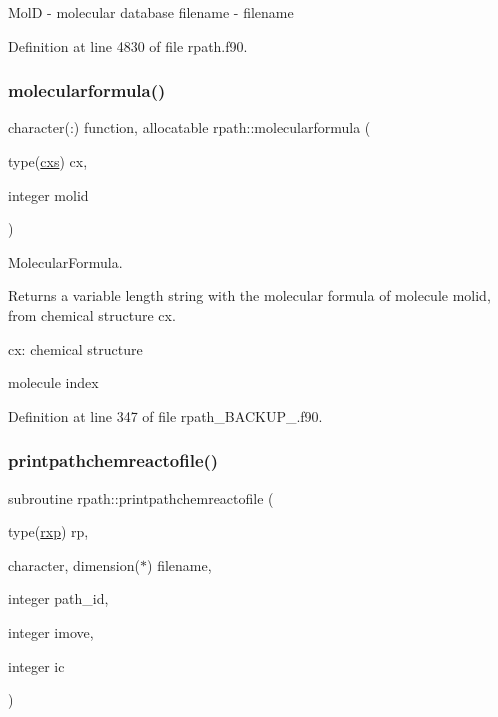 MolD -\/ molecular database filename -\/ filename 

Definition at line 4830 of file rpath.\+f90.

\mbox{\label{namespacerpath_ad5763afa90216356bb2694841d938592}} 
\subsubsection{\texorpdfstring{molecularformula()}{molecularformula()}}
{\footnotesize\ttfamily character(\+:) function, allocatable rpath\+::molecularformula (\begin{DoxyParamCaption}\item[{type(\mbox{\hyperlink{structchemstr_1_1cxs}{cxs}})}]{cx,  }\item[{integer}]{molid }\end{DoxyParamCaption})}



Molecular\+Formula. 

Returns a variable length string with the molecular formula of molecule molid, from chemical structure cx.


\begin{DoxyItemize}
\item cx\+: chemical structure
\item molecule index 
\end{DoxyItemize}

Definition at line 347 of file rpath\+\_\+\+B\+A\+C\+K\+U\+P\+\_.\+f90.

\mbox{\label{namespacerpath_a3ea5ea388547f210105034dd8fdab394}} 
\subsubsection{\texorpdfstring{printpathchemreactofile()}{printpathchemreactofile()}\hspace{0.1cm}{\footnotesize\ttfamily [2/2]}}
{\footnotesize\ttfamily subroutine rpath\+::printpathchemreactofile (\begin{DoxyParamCaption}\item[{type(\mbox{\hyperlink{structrpath_1_1rxp}{rxp}})}]{rp,  }\item[{character, dimension($\ast$)}]{filename,  }\item[{integer}]{path\+\_\+id,  }\item[{integer}]{imove,  }\item[{integer}]{ic }\end{DoxyParamCaption})}



